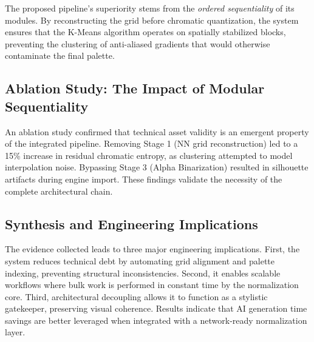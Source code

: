 \documentclass[runningheads]{llncs}
\begin{document}
\begin{table}[ht]
\footnotesize
\centering
\caption{Comparison against standard baselines}
\label{tab:comparison}
\end{table}

The proposed pipeline's superiority stems from the \textit{ordered sequentiality} of its modules. By reconstructing the grid before chromatic quantization, the system ensures that the K-Means algorithm operates on spatially stabilized blocks, preventing the clustering of anti-aliased gradients that would otherwise contaminate the final palette.

\subsection{Ablation Study: The Impact of Modular Sequentiality}

An ablation study confirmed that technical asset validity is an emergent property of the integrated pipeline. Removing Stage 1 (NN grid reconstruction) led to a 15\% increase in residual chromatic entropy, as clustering attempted to model interpolation noise. Bypassing Stage 3 (Alpha Binarization) resulted in silhouette artifacts during engine import. These findings validate the necessity of the complete architectural chain.

\subsection{Synthesis and Engineering Implications}

The evidence collected leads to three major engineering implications. First, the system reduces technical debt by automating grid alignment and palette indexing, preventing structural inconsistencies. Second, it enables scalable workflows where bulk work is performed in constant time by the normalization core. Third, architectural decoupling allows it to function as a stylistic gatekeeper, preserving visual coherence. Results indicate that AI generation time savings are better leveraged when integrated with a network-ready normalization layer.
\end{document}
